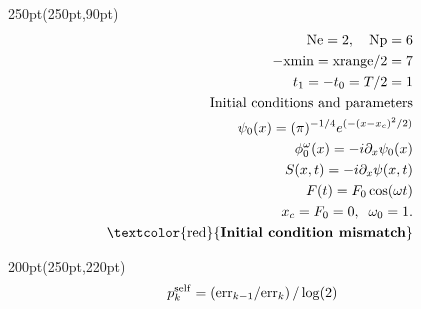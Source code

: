 \begin{frame}
\begin{textblock*}{250pt}(250pt,90pt)
	\begin{align}
         {\rm Ne} = 2,\hspace{10pt} {\rm Np}  = 6 &\nonumber\\
		-{\rm xmin} = {\rm xrange}/2  = 7 &\nonumber\\
		             t_1 = -t_0 = T/2 = 1 &\nonumber\\
	  \mbox{Initial conditions and parameters}&\nonumber\\
       \psi_0(x) = (\pi)^{-1/4}e^{(-(x-x_c)^2/2)} &\nonumber\\
	 \phi^\omega_0(x) = -i\partial_x \psi_0(x)&\nonumber\\
		    S(x,t) = -i\partial_x\psi(x,t)&\nonumber\\
		          F(t) = F_0\cos(\omega t)&\nonumber\\
		     x_c = F_0 = 0,\;\;\omega_0 = 1. &\nonumber \\
		\mbox{\textcolor{red}{\textbf{Initial condition mismatch}}}&
         \end{align}
\end{textblock*}
\begin{textblock*}{200pt}(250pt,220pt)
	\begin{align}
	p_k^{\rm self} & = \left({\rm err}_{k-1}/{\rm err}_{k}\right)/\log(2) \nonumber
	\end{align}

\end{textblock*}


\end{frame}



